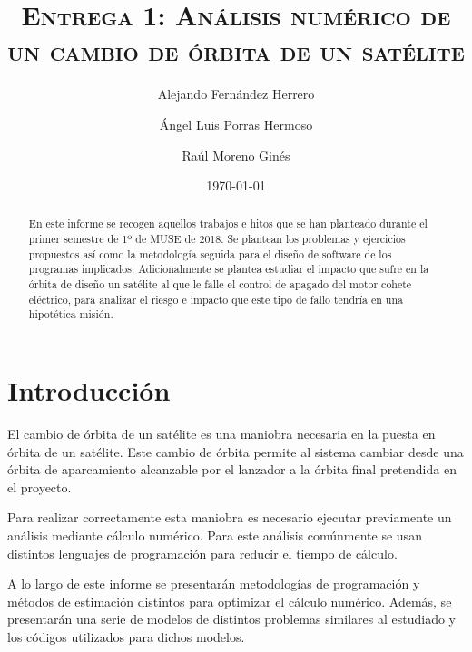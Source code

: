 \documentclass[11pt,singlespacing,liststotoc,headsepline,a4paper]{article}
\title{\textsc{\Huge Entrega 1: Análisis numérico de un cambio de órbita de un satélite}}
\author{
	Alejando Fernández Herrero\\
	\and
	Ángel Luis Porras Hermoso\\
	\and
	Raúl Moreno Ginés
}
\date{\today}
\begin{document}
\medskip
\vfill
{\let\newpage\relax\maketitle}
\vfill
\medskip
\thispagestyle{empty}
\clearpage

\newpage

\begin{abstract}
	
En este informe se recogen aquellos trabajos e hitos que se han planteado durante el primer semestre de 1º de MUSE de 2018. Se plantean los problemas y ejercicios propuestos así como la metodología seguida para el diseño de software de los programas implicados. Adicionalmente se  plantea estudiar el impacto que sufre en la órbita de diseño un satélite al que le falle el control de apagado del motor cohete eléctrico, para analizar el riesgo e impacto que este tipo de fallo tendría en una hipotética misión.\\

\end{abstract}

\thispagestyle{empty}
\clearpage

\newpage
\tableofcontents %
\newpage
\listoffigures
\thispagestyle{empty}
\clearpage

\renewcommand{\thepage}{\arabic{page}}
\setcounter{page}{1}

	\newpage

\section{Introducción}
El cambio de órbita de un satélite es una maniobra necesaria en la puesta en órbita de un satélite. Este cambio de órbita permite al sistema cambiar desde una órbita de aparcamiento alcanzable por el lanzador a la órbita final pretendida en el proyecto.

Para realizar correctamente esta maniobra es necesario ejecutar previamente un análisis mediante cálculo numérico. Para este análisis comúnmente se usan distintos lenguajes de programación para reducir el tiempo de cálculo.

A lo largo de este informe se presentarán metodologías de programación y métodos de estimación distintos para optimizar el cálculo numérico. Además, se presentarán una serie de modelos de distintos problemas similares al estudiado y los códigos utilizados para dichos modelos.

	\newpage
	
\end{document}
